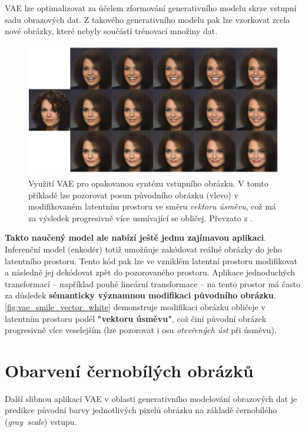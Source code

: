 VAE lze optimalizovat za účelem zformování generativního modelu skrze vstupní sadu obrazových dat.
Z takového generativního modelu pak lze vzorkovat zcela nové obrázky, které nebyly součástí trénovací množiny dat. \cite{Kingma2019}

\begin{figure}[H]
    \centering
    \includegraphics[width=\textwidth]{figures/applications/vae_smile_vector_white.png}
    \caption{Využití VAE pro opakovanou syntézu vstupního obrázku. V tomto příkladě lze pozorovat posun původního obrázku (vlevo) v modifikovaném latentním prostoru ve směru \emph{vektoru úsměvu}, což má za výsledek progresivně více usmívající se obličej. Převzato z \textcite{White2016}.}
    \label{fig:vae_smile_vector_white}
\end{figure}


\textbf{Takto naučený model ale nabízí ještě jednu zajímavou aplikaci}.
Inferenční model (enkodér) totiž umožňuje zakódovat reálné obrázky do jeho latentního prostoru.
Tento kód pak lze ve vzniklém latentní prostoru modifikovat a následně jej dekódovat zpět do pozorovaného prostoru.
Aplikace jednoduchých transformací – například pouhé lineární transformace – na tento prostor má často za důsledek \textbf{sémanticky významnou modifikaci původního obrázku}.
\autoref{fig:vae_smile_vector_white} demonstruje modifikaci obrázku obličeje v latentním prostoru podél \textbf{"vektoru úsměvu"}, což činí původní obrázek progresivně více veselejším (lze pozorovat i osu \emph{otevřených úst} při úsměvu). \cite{Kingma2019}

\newpage
\section{Obarvení černobílých obrázků}
\label{sec:applications_image_coloring}
Další slibnou aplikací VAE v oblasti generativního modelování obrazových dat je predikce původní barvy jednotlivých pixelů obrázku na základě černobílého (\emph{gray~scale}) vstupu.

